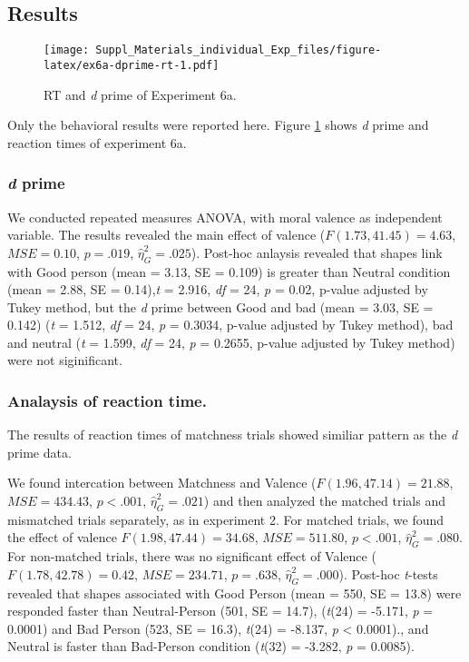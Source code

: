 \documentclass[man]{apa6}
\begin{document}
\hypertarget{results-9}{%
\subsection{Results}\label{results-9}}

\begin{figure}
\centering
\texttt{[image: Suppl\_Materials\_individual\_Exp\_files/figure-latex/ex6a-dprime-rt-1.pdf]}
\caption{\label{fig:ex6a-dprime-rt}RT and \emph{d} prime of Experiment 6a.}
\end{figure}

Only the behavioral results were reported here. Figure \ref{fig:ex6a-dprime-rt} shows \emph{d} prime and reaction times of experiment 6a.

\hypertarget{d-prime-6}{%
\subsubsection{\texorpdfstring{\emph{d} prime}{d prime}}\label{d-prime-6}}

We conducted repeated measures ANOVA, with moral valence as independent variable. The results revealed the main effect of valence (\(F(1.73, 41.45) = 4.63\), \(\mathit{MSE} = 0.10\), \(p = .019\), \(\hat{\eta}^2_G = .025\)). Post-hoc anlaysis revealed that shapes link with Good person (mean = 3.13, SE = 0.109) is greater than Neutral condition (mean = 2.88, SE = 0.14),\emph{t} = 2.916, \emph{df} = 24, \emph{p} = 0.02, p-value adjusted by Tukey method, but the \emph{d} prime between Good and bad (mean = 3.03, SE = 0.142) (\emph{t} = 1.512, \emph{df} = 24, \emph{p} = 0.3034, p-value adjusted by Tukey method), bad and neutral (\emph{t} = 1.599, \emph{df} = 24, \emph{p} = 0.2655, p-value adjusted by Tukey method) were not siginificant.

\hypertarget{analaysis-of-reaction-time.}{%
\subsubsection{Analaysis of reaction time.}\label{analaysis-of-reaction-time.}}

The results of reaction times of matchness trials showed similiar pattern as the \emph{d} prime data.

We found intercation between Matchness and Valence (\(F(1.96, 47.14) = 21.88\), \(\mathit{MSE} = 434.43\), \(p < .001\), \(\hat{\eta}^2_G = .021\)) and then analyzed the matched trials and mismatched trials separately, as in experiment 2. For matched trials, we found the effect of valence \(F(1.98, 47.44) = 34.68\), \(\mathit{MSE} = 511.80\), \(p < .001\), \(\hat{\eta}^2_G = .080\). For non-matched trials, there was no significant effect of Valence (\(F(1.78, 42.78) = 0.42\), \(\mathit{MSE} = 234.71\), \(p = .638\), \(\hat{\eta}^2_G = .000\)). Post-hoc \emph{t}-tests revealed that shapes associated with Good Person (mean = 550, SE = 13.8) were responded faster than Neutral-Person (501, SE = 14.7), (\emph{t}(24) = -5.171, \emph{p} = 0.0001) and Bad Person (523, SE = 16.3), \emph{t}(24) = -8.137, \emph{p} \textless{} 0.0001)., and Neutral is faster than Bad-Person condition (\emph{t}(32) = -3.282, \emph{p} = 0.0085).
\end{document}
